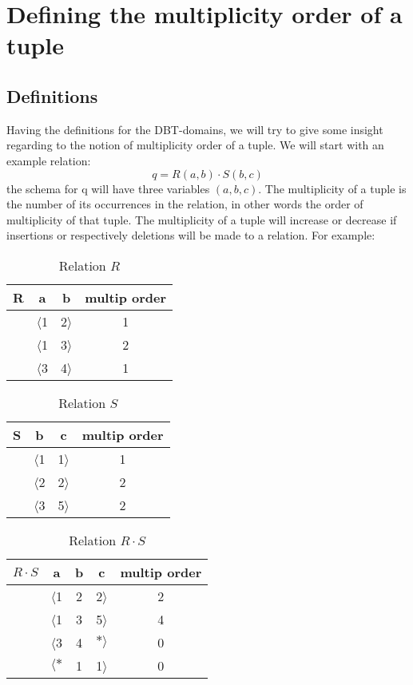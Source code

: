 \documentclass[12pt]{article}
\begin{document}
\section{Defining the multiplicity order of a tuple}

\subsection{Definitions}

Having the definitions for the DBT-domains, we will try to give some insight regarding to the notion of multiplicity order of a tuple. We will start with an example relation: $$q=R(a,b)\cdot S(b,c)$$ the schema for q will have three variables $(a,b,c)$. The multiplicity of a tuple is the number of its occurrences in the relation, in other words the order of multiplicity of that tuple. The multiplicity of a tuple will increase or decrease if insertions or respectively deletions will be made to a relation. For example:
\begin{table}[ht]
\centering
\begin{tabular}{c c c c}
	R & a & b & multip order\\ [0.2ex]
	\hline
	  & $\langle $1 & 2$\rangle$ & 1 \\
	  & $\langle $1 & 3$\rangle$ & 2 \\
	  & $\langle $3 & 4$\rangle$ & 1 \\
\end{tabular}
\caption{Relation $R$}
\end{table}
\begin{table}[ht]
\centering
\begin{tabular}{c c c c}
	S & b & c & multip order\\ [0.2ex]
	\hline
	  & $\langle $1 & 1$\rangle$ & 1 \\
	  & $\langle $2 & 2$\rangle$ & 2 \\
	  & $\langle $3 & 5$\rangle$ & 2 \\
\end{tabular}
\caption{Relation $S$}
\end{table}
\begin{table}[ht]
\centering
\begin{tabular}{c c c c c}
	$R\cdot S$ & a & b & c & multip order\\ [0.2ex]
	\hline
	  & $\langle $1 & 2 & 2$\rangle$ & 2 \\
	  & $\langle $1 & 3 & 5$\rangle$ & 4 \\
	  & $\langle $3 & 4 & $*\rangle$ & 0 \\
	  & $\langle *$ & 1 & 1$\rangle$ & 0 \\
\end{tabular}
\caption{Relation $R\cdot S$}
\end{table}
\end{document}
